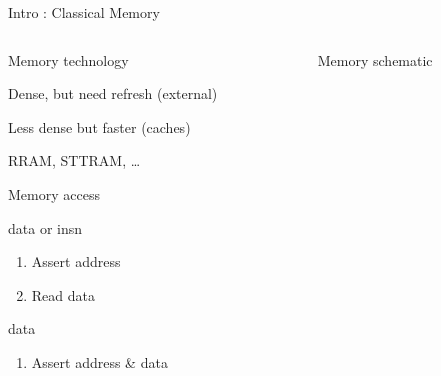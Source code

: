%
\begin{Frame}{Intro : Classical Memory}
  \begin{columns}[t]
    \begin{column}{7cm} %
      \begin{block}{Memory technology}
        \begin{description}[DRAM]
        \item[\href{https://en.wikipedia.org/wiki/Dynamic_random-access_memory}{DRAM}]
          Dense, but need refresh (external)
        \item[\href{https://en.wikipedia.org/wiki/Static_random-access_memory}{SRAM}]
          Less dense but faster (caches)
        \item[Other] RRAM, STTRAM, \ldots
        \end{description}
      \end{block}
      \begin{block}{Memory access}
        \begin{description}[LOAD]
        \item[LOAD] data or insn
          \begin{enumerate}
          \item Assert address
          \item Read data
          \end{enumerate}
        \item[STORE] data
          \begin{enumerate}
          \item Assert address \& data
          \end{enumerate}
        \end{description}
      \end{block}
    \end{column}

    \begin{column}{5cm} %
      \begin{block}{Memory schematic}
      \end{block}
    \end{column}
  \end{columns}
\end{Frame}

